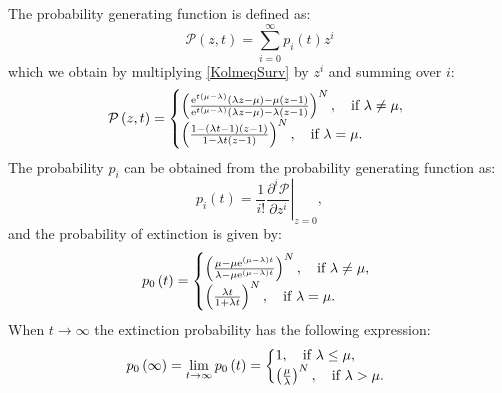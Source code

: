 \documentclass[12pt]{extarticle}
\newcommand{\e}{{\rm e}}
\begin{document}
\begin{appendices}
The probability generating function is defined as:
\begin{equation*}
\mathcal{P}\left(z,t\right)=\sum_{i=0}^\infty p_i\left(t\right)z^i
\end{equation*}
which we obtain by multiplying \eqref{KolmeqSurv} by $z^i$ and summing over $i$:
\begin{align*}
\mathcal{P}\left(z,t\right)=\left\{
  \begin{array}{@{}ll@{}}
  \left(\frac{\e^{t\left(\mu-\lambda\right)}\left(\lambda z-\mu\right)-\mu\left(z-1\right)}{\e^{t\left(\mu-\lambda\right)}\left(\lambda z-\mu\right)-\lambda\left(z-1\right)}\right)^N,\quad \text{if }\lambda\neq\mu, \\
  \left(\frac{1-\left(\lambda t-1\right)\left(z-1\right)}{1-\lambda t\left(z-1\right)}\right)^N,\quad \text{if }\lambda=\mu.
  \end{array}\right.
\end{align*}
The probability $p_i$ can be obtained from the probability generating function as:
\begin{equation*}
p_i\left(t\right)=\left.\frac{1}{i!}\frac{\partial^i\mathcal{P}}{\partial z^i}\right|_{z=0},
\end{equation*}
and the probability of extinction is given by:
\begin{align*}
p_0\left(t\right)=\left\{
  \begin{array}{@{}ll@{}}
  \left(\frac{\mu-\mu\e^{\left(\mu-\lambda\right)t}}{\lambda-\mu\e^{\left(\mu-\lambda\right)t}}\right)^N,\quad \text{if }\lambda\neq\mu, \\
  \left(\frac{\lambda t}{1+\lambda t}\right)^N,\quad \text{if }\lambda=\mu.
  \end{array}\right.
\end{align*}
When $t\rightarrow\infty$ the extinction probability has the following expression:
\begin{align*}
p_0\left(\infty\right)=\lim_{t\rightarrow\infty}p_0\left(t\right)=\left\{
  \begin{array}{@{}ll@{}}
  1,\quad \text{if }\lambda\leq\mu, \\
  \left(\frac{\mu}{\lambda}\right)^N,\quad \text{if }\lambda>\mu.
  \end{array}\right.
\end{align*}

\end{appendices}
\end{document}

